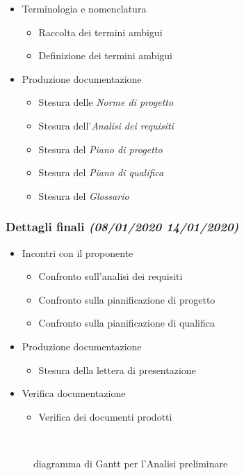 \documentclass[../piano-di-progetto.tex]{subfiles}
\begin{document}
\begin{itemize}
\begin{itemize}
  \end{itemize}
  \item Terminologia e nomenclatura
  \begin{itemize}
    \item Raccolta dei termini ambigui
    \item Definizione dei termini ambigui
  \end{itemize}
  \item Produzione documentazione
  \begin{itemize}
    \item Stesura delle \textit{Norme di progetto}
    \item Stesura dell'\textit{Analisi dei requisiti}
    \item Stesura del \textit{Piano di progetto}
    \item Stesura del \textit{Piano di qualifica}
    \item Stesura del \textit{Glossario}
  \end{itemize}
\end{itemize}
\subsubsection[Dettagli finali]{Dettagli finali {\normalsize\normalfont\itshape(08/01/2020  14/01/2020)}}%
\label{subs:dettagli_finali}
\begin{itemize}
  \item Incontri con il proponente
  \begin{itemize}
    \item Confronto sull'analisi dei requisiti
    \item Confronto sulla pianificazione di progetto
    \item Confronto sulla pianificazione di qualifica
  \end{itemize}
  \item Produzione documentazione
  \begin{itemize}
    \item Stesura della lettera di presentazione
  \end{itemize}
  \item Verifica documentazione
  \begin{itemize}
    \item Verifica dei documenti prodotti
  \end{itemize}
\end{itemize}
\begin{figure}[H]
  \centering
  
  \caption{diagramma di Gantt per l'Analisi preliminare}%
~~\label{fig:gantt_analisi_preliminare}
\end{figure}
\end{document}
